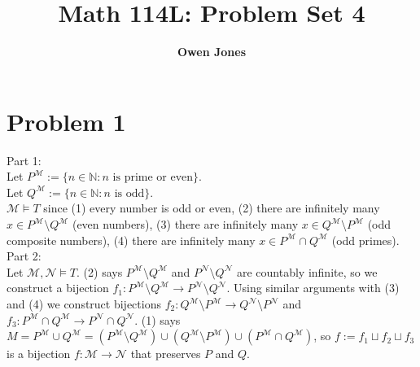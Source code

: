 \documentclass[10pt]{article}
\title{\bf Math 114L\@: Problem Set 4}
\author{\bf Owen Jones}
\begin{document}
\maketitle
\section*{Problem 1}
Part 1:\\
Let $P^\mathcal{M}:=\{n\in\mathbb{N}: n\text{ is prime or even}\}$.\\
Let $Q^\mathcal{M}:=\{n\in\mathbb{N}: n\text{ is odd}\}$.\\ 
$\mathcal{M}\models T$ since (1) every number is odd or even, (2) there are infinitely many $x\in P^\mathcal{M}\setminus Q^\mathcal{M}$ (even numbers), (3) there are infinitely many $x\in Q^\mathcal{M}\setminus P^\mathcal{M}$ (odd composite numbers), (4) there are infinitely many $x\in P^\mathcal{M}\cap Q^\mathcal{M}$ (odd primes).\\
Part 2:\\
Let $\mathcal{M},\mathcal{N}\models T$. 
(2) says $P^\mathcal{M}\setminus Q^\mathcal{M}$ and $ P^\mathcal{N}\setminus Q^\mathcal{N}$ are countably infinite, so we construct a bijection $f_1: P^\mathcal{M}\setminus Q^\mathcal{M}\rightarrow  P^\mathcal{N}\setminus Q^\mathcal{N}$. 
Using similar arguments with (3) and (4) we construct bijections $f_2: Q^\mathcal{M}\setminus P^\mathcal{M}\rightarrow  Q^\mathcal{N}\setminus P^\mathcal{N}$ and $f_3: P^\mathcal{M}\cap Q^\mathcal{M}\rightarrow  P^\mathcal{N}\cap Q^\mathcal{N}$. 
(1) says $M=P^\mathcal{M}\cup Q^\mathcal{M}=(P^\mathcal{M}\setminus Q^\mathcal{M})\cup(Q^\mathcal{M}\setminus P^\mathcal{M})\cup(P^\mathcal{M}\cap Q^\mathcal{M})$, so $f:=f_1\sqcup f_2\sqcup f_3$ is a bijection $f:\mathcal{M}\rightarrow\mathcal{N}$ that preserves $P$ and $Q$.
\end{document}
